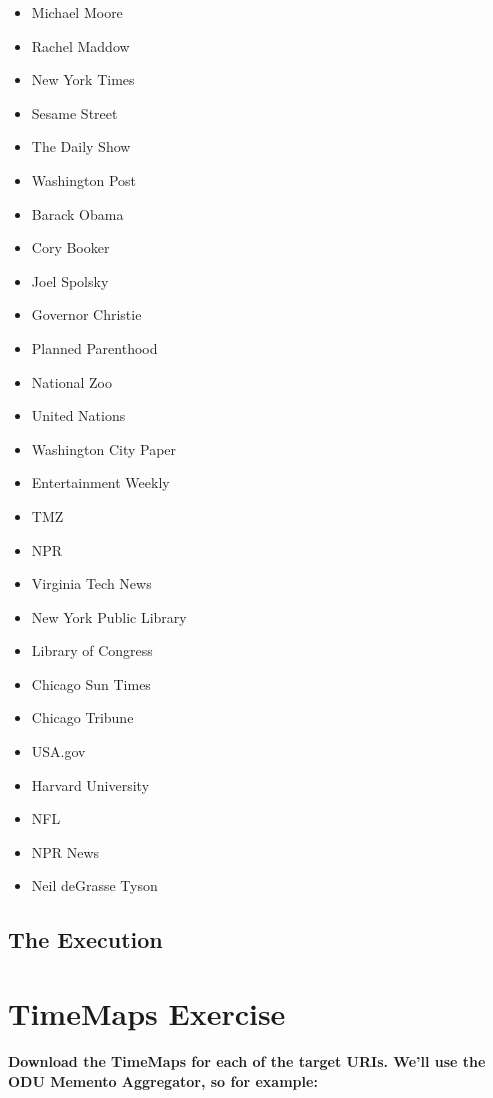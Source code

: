 \documentclass{article}
\begin{document}
\begin{itemize}
\item Michael Moore
\item Rachel Maddow
\item New York Times
\item Sesame Street
\item The Daily Show
\item Washington Post
\item Barack Obama
\item Cory Booker
\item Joel Spolsky
\item Governor Christie
\item Planned Parenthood
\item National Zoo
\item United Nations
\item Washington City Paper
\item Entertainment Weekly
\item TMZ
\item NPR
\item Virginia Tech News
\item New York Public Library
\item Library of Congress
\item Chicago Sun Times
\item Chicago Tribune
\item USA.gov
\item Harvard University
\item NFL
\item NPR News
\item Neil deGrasse Tyson
\end{itemize}



\subsection*{The Execution}




\begin{figure}[H]
\centering
\caption{}
\label{turtle}
\end{figure}

\newpage

\section{TimeMaps Exercise}
\textbf{Download the TimeMaps for each of the target URIs. We'll use the ODU Memento Aggregator, so for example:}
\end{document}
